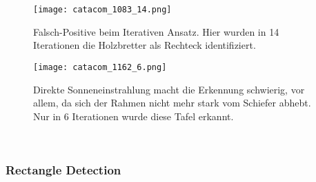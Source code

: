 \begin{SCfigure}[0.5][h!]
\caption{Falsch-Positive beim Iterativen Ansatz. Hier wurden in 14 Iterationen die Holzbretter als Rechteck identifiziert.}
\texttt{[image: catacom\_1083\_14.png]}
\end{SCfigure} \begin{SCfigure}[0.5][h!]
\caption{Direkte Sonneneinstrahlung macht die Erkennung schwierig, vor allem, da sich der Rahmen nicht mehr stark vom Schiefer abhebt. Nur in 6 Iterationen wurde diese Tafel erkannt.}
\texttt{[image: catacom\_1162\_6.png]}
\end{SCfigure}\\

\subsubsection{Rectangle Detection}

